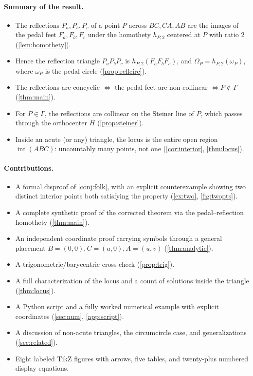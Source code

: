 \documentclass[11pt,a4paper]{article}
\theoremstyle{definition}
\newcommand{\Pa}{P_{a}}
\newcommand{\Pb}{P_{b}}
\newcommand{\Pc}{P_{c}}
\newcommand{\Fa}{F_{a}}
\newcommand{\Fb}{F_{b}}
\newcommand{\Fc}{F_{c}}
\newcommand{\circc}{\Gamma}
\newcommand{\pedalc}{\omega_{P}}
\newcommand{\reflc}{\Omega_{P}}
\begin{document}
\paragraph{Summary of the result.}
\begin{itemize}
  \item The reflections $\Pa,\Pb,\Pc$ of a point $P$ across $BC,CA,AB$ are the images of the pedal feet $\Fa,\Fb,\Fc$ under the homothety $h_{P,2}$ centered at $P$ with ratio $2$ (\cref{lem:homothety}).
  \item Hence the reflection triangle $\Pa\Pb\Pc$ is $h_{P,2}(\Fa\Fb\Fc)$, and $\reflc=h_{P,2}(\pedalc)$, where $\pedalc$ is the pedal circle (\cref{prop:reflcirc}).
  \item The reflections are concyclic $\iff$ the pedal feet are non-collinear $\iff P\notin\circc$ (\cref{thm:main}).
  \item For $P\in\circc$, the reflections are collinear on the Steiner line of $P$, which passes through the orthocenter $H$ (\cref{prop:steiner}).
  \item Inside an acute (or any) triangle, the locus is the entire open region $\operatorname{int}(ABC)$: uncountably many points, not one (\cref{cor:interior}, \cref{thm:locus}).
\end{itemize}

\paragraph{Contributions.}
\begin{itemize}
  \item A formal disproof of \cref{conj:folk}, with an explicit counterexample showing two distinct interior points both satisfying the property (\cref{ex:two}, \cref{fig:twopts}).
  \item A complete synthetic proof of the corrected theorem via the pedal--reflection homothety (\cref{thm:main}).
  \item An independent coordinate proof carrying symbols through a general placement $B=(0,0), C=(a,0), A=(u,v)$ (\cref{thm:analytic}).
  \item A trigonometric/barycentric cross-check (\cref{prop:trig}).
  \item A full characterization of the locus and a count of solutions inside the triangle (\cref{thm:locus}).
  \item A Python script and a fully worked numerical example with explicit coordinates (\cref{sec:num}, \cref{app:script}).
  \item A discussion of non-acute triangles, the circumcircle case, and generalizations (\cref{sec:related}).
  \item Eight labeled TikZ figures with arrows, five tables, and twenty-plus numbered display equations.
\end{itemize}
\end{document}
